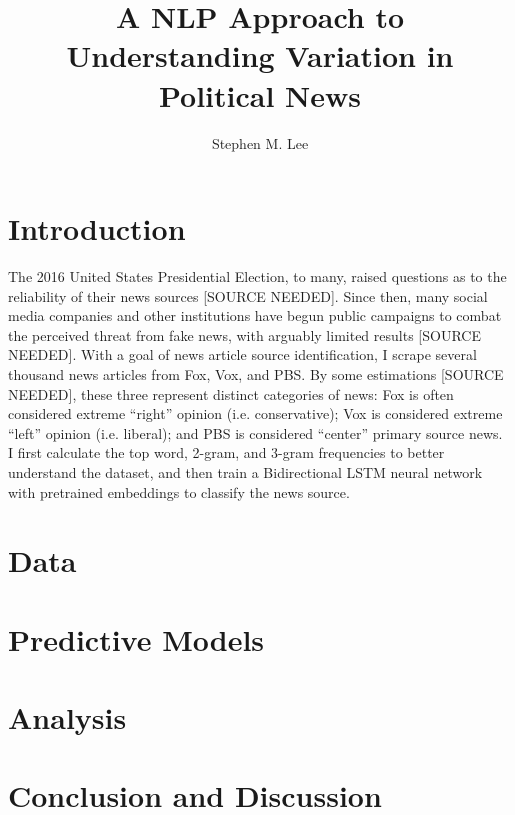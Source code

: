 \documentclass{article}
\author{Stephen M. Lee}
\title{A NLP Approach to Understanding Variation in Political News}
\begin{document}
	\maketitle 
	
	\section{Introduction}
	The 2016 United States Presidential Election, to many, raised questions as to the reliability of their news sources [SOURCE NEEDED]. Since then, many social media companies and other institutions have begun public campaigns to combat the perceived threat from fake news, with arguably limited results [SOURCE NEEDED]. With a goal of news article source identification, I scrape several thousand news articles from Fox, Vox, and PBS. By some estimations [SOURCE NEEDED], these three represent distinct categories of news: Fox is often considered extreme “right” opinion (i.e. conservative); Vox is considered extreme “left” opinion (i.e. liberal); and PBS is considered “center” primary source news. I first calculate the top word, 2-gram, and 3-gram frequencies to better understand the dataset, and then train a Bidirectional LSTM neural network with pretrained embeddings to classify the news source. 
	
	\section{Data}
	
	\section{Predictive Models}
	
	\section{Analysis}
	
	\section{Conclusion and Discussion}
	
\end{document}
